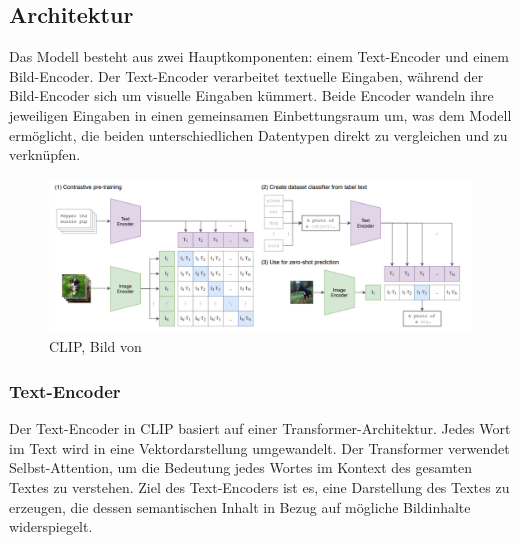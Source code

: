 \documentclass[nolibertine, ngerman, algorithm, nomencl, minted]{ttlab-qualify}
\begin{document}
\subsection{Architektur}
Das Modell besteht aus zwei Hauptkomponenten: einem Text-Encoder und einem Bild-Encoder. Der Text-Encoder verarbeitet textuelle Eingaben, während der Bild-Encoder sich um visuelle Eingaben kümmert. Beide Encoder wandeln ihre jeweiligen Eingaben in einen gemeinsamen Einbettungsraum um, was dem Modell ermöglicht, die beiden unterschiedlichen Datentypen direkt zu vergleichen und zu verknüpfen.
\begin{figure}[h]
	\centering
	\includegraphics[scale=0.4]{static/CLIP.png}
	\caption{CLIP, Bild von \textcite{radford2021learning}}
	\label{fig:2.4}
\end{figure}
\subsubsection{Text-Encoder}
Der Text-Encoder in CLIP basiert auf einer Transformer-Architektur. Jedes Wort im Text wird in eine Vektordarstellung umgewandelt. Der Transformer verwendet Selbst-Attention, um die Bedeutung jedes Wortes im Kontext des gesamten Textes zu verstehen. Ziel des Text-Encoders ist es, eine Darstellung des Textes zu erzeugen, die dessen semantischen Inhalt in Bezug auf mögliche Bildinhalte widerspiegelt.
\end{document}
